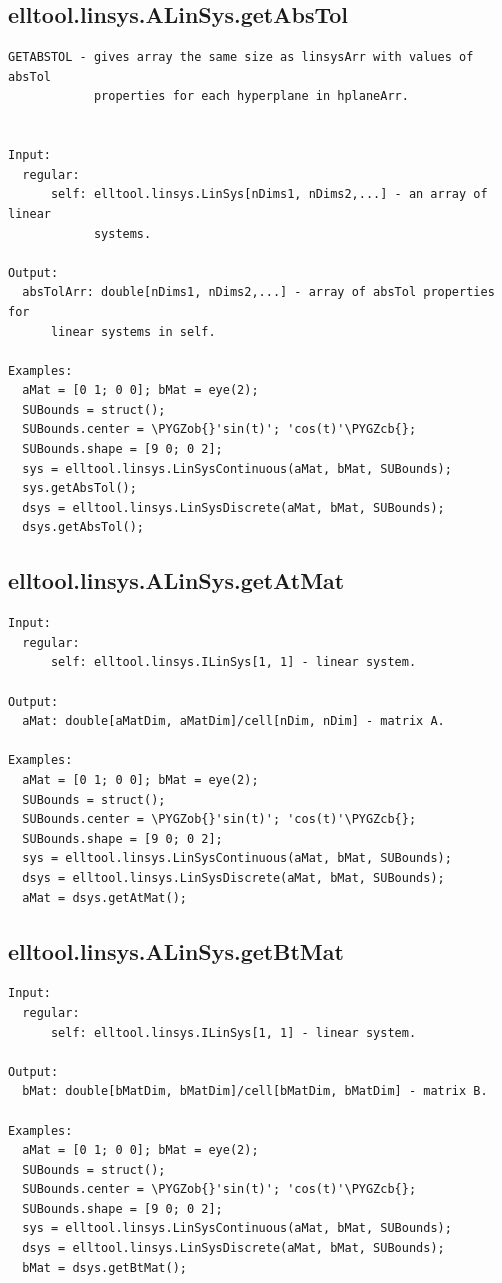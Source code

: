 \documentclass[letterpaper,10pt,english]{sphinxmanual}
\def\PYGZob{\char`\{}
\def\PYGZcb{\char`\}}
\begin{document}
\subsection{elltool.linsys.ALinSys.getAbsTol}
\label{chap_functions:elltool-linsys-alinsys-getabstol}
\begin{Verbatim}[commandchars=\\\{\}]
GETABSTOL - gives array the same size as linsysArr with values of absTol
            properties for each hyperplane in hplaneArr.


Input:
  regular:
      self: elltool.linsys.LinSys[nDims1, nDims2,...] - an array of linear
            systems.

Output:
  absTolArr: double[nDims1, nDims2,...] - array of absTol properties for
      linear systems in self.

Examples:
  aMat = [0 1; 0 0]; bMat = eye(2);
  SUBounds = struct();
  SUBounds.center = \PYGZob{}'sin(t)'; 'cos(t)'\PYGZcb{};
  SUBounds.shape = [9 0; 0 2];
  sys = elltool.linsys.LinSysContinuous(aMat, bMat, SUBounds);
  sys.getAbsTol();
  dsys = elltool.linsys.LinSysDiscrete(aMat, bMat, SUBounds);
  dsys.getAbsTol();
\end{Verbatim}


\subsection{elltool.linsys.ALinSys.getAtMat}
\label{chap_functions:elltool-linsys-alinsys-getatmat}
\begin{Verbatim}[commandchars=\\\{\}]
Input:
  regular:
      self: elltool.linsys.ILinSys[1, 1] - linear system.

Output:
  aMat: double[aMatDim, aMatDim]/cell[nDim, nDim] - matrix A.

Examples:
  aMat = [0 1; 0 0]; bMat = eye(2);
  SUBounds = struct();
  SUBounds.center = \PYGZob{}'sin(t)'; 'cos(t)'\PYGZcb{};
  SUBounds.shape = [9 0; 0 2];
  sys = elltool.linsys.LinSysContinuous(aMat, bMat, SUBounds);
  dsys = elltool.linsys.LinSysDiscrete(aMat, bMat, SUBounds);
  aMat = dsys.getAtMat();
\end{Verbatim}


\subsection{elltool.linsys.ALinSys.getBtMat}
\label{chap_functions:elltool-linsys-alinsys-getbtmat}
\begin{Verbatim}[commandchars=\\\{\}]
Input:
  regular:
      self: elltool.linsys.ILinSys[1, 1] - linear system.

Output:
  bMat: double[bMatDim, bMatDim]/cell[bMatDim, bMatDim] - matrix B.

Examples:
  aMat = [0 1; 0 0]; bMat = eye(2);
  SUBounds = struct();
  SUBounds.center = \PYGZob{}'sin(t)'; 'cos(t)'\PYGZcb{};
  SUBounds.shape = [9 0; 0 2];
  sys = elltool.linsys.LinSysContinuous(aMat, bMat, SUBounds);
  dsys = elltool.linsys.LinSysDiscrete(aMat, bMat, SUBounds);
  bMat = dsys.getBtMat();
\end{Verbatim}
\end{document}
